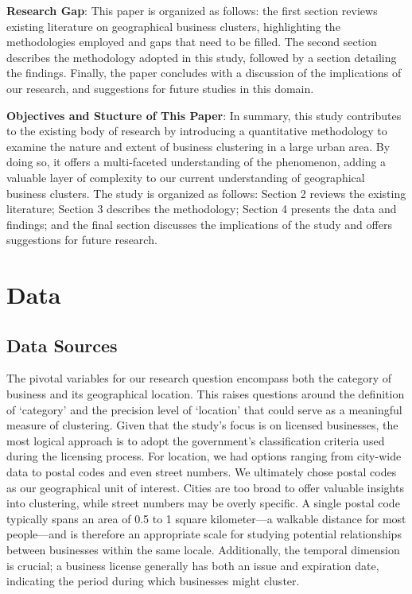 \documentclass[
]{article}
\begin{document}
\textbf{Research Gap}: This paper is organized as follows: the first section reviews existing literature on geographical business clusters, highlighting the methodologies employed and gaps that need to be filled. The second section describes the methodology adopted in this study, followed by a section detailing the findings. Finally, the paper concludes with a discussion of the implications of our research, and suggestions for future studies in this domain.

\textbf{Objectives and Stucture of This Paper}: In summary, this study contributes to the existing body of research by introducing a quantitative methodology to examine the nature and extent of business clustering in a large urban area. By doing so, it offers a multi-faceted understanding of the phenomenon, adding a valuable layer of complexity to our current understanding of geographical business clusters. The study is organized as follows: Section 2 reviews the existing literature; Section 3 describes the methodology; Section 4 presents the data and findings; and the final section discusses the implications of the study and offers suggestions for future research.

\hypertarget{data}{%
\section{Data}\label{data}}

\hypertarget{data-sources}{%
\subsection{Data Sources}\label{data-sources}}

The pivotal variables for our research question encompass both the category of business and its geographical location. This raises questions around the definition of `category' and the precision level of `location' that could serve as a meaningful measure of clustering. Given that the study's focus is on licensed businesses, the most logical approach is to adopt the government's classification criteria used during the licensing process. For location, we had options ranging from city-wide data to postal codes and even street numbers. We ultimately chose postal codes as our geographical unit of interest. Cities are too broad to offer valuable insights into clustering, while street numbers may be overly specific. A single postal code typically spans an area of 0.5 to 1 square kilometer---a walkable distance for most people---and is therefore an appropriate scale for studying potential relationships between businesses within the same locale. Additionally, the temporal dimension is crucial; a business license generally has both an issue and expiration date, indicating the period during which businesses might cluster.
\end{document}
